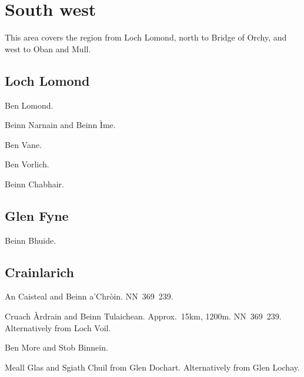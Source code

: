 \section{South west}

This area covers the region from Loch Lomond, north to Bridge of Orchy, and
west to Oban and Mull.  

\subsection{Loch Lomond}

\begin{munros}
\item Ben Lomond.  \tick

\item Beinn Narnain and Beinn Ìme.

\item Ben Vane.  \tick

\item Ben Vorlich.

\item Beinn Chabhair. \tick
\end{munros}


\subsection{Glen Fyne}

\begin{munros}
\item Beinn Bhuide.
\end{munros}


\subsection{Crainlarich}

\begin{munros}
\item An Caisteal and Beinn a'Chròin.  NN~369~239.

\item \target Cruach Àrdrain and Beinn Tulaichean.  Approx.\ 15km, 1200m.
  NN~369~239.  Alternatively from Loch Voil.

\item Ben More and Stob Binnein.

\item Meall Glas and Sgiath Chuil from Glen Dochart.  Alternatively from Glen
  Lochay.  \tick
\end{munros}

